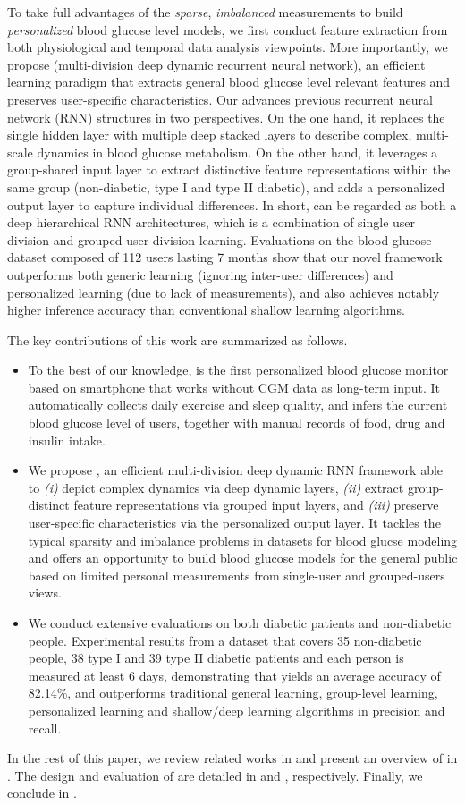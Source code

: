 To take full advantages of the \emph{sparse}, \emph{imbalanced} measurements to build \emph{personalized} blood glucose level models, we first conduct feature extraction from both physiological and temporal data analysis viewpoints. More importantly, we propose \modelname (multi-division deep dynamic recurrent neural network), an efficient learning paradigm that extracts general blood glucose level relevant features and preserves user-specific characteristics.
Our \modelname advances previous recurrent neural network (RNN) structures in two perspectives.
On the one hand, it replaces the single hidden layer with multiple deep stacked layers to describe complex, multi-scale dynamics in blood glucose metabolism.
On the other hand, it leverages a group-shared input layer to extract distinctive feature representations within the same group (\ie non-diabetic, type I and type II diabetic), and adds a personalized output layer to capture individual differences.
In short, \modelname can be regarded as both a deep hierarchical RNN architectures, \textcolor[rgb]{1.00,0.00,0.00}{which is a combination of single user division and grouped user division learning}.
Evaluations on the blood glucose dataset composed of 112 users lasting 7 months show that our novel \modelname framework outperforms both generic learning (\ie ignoring inter-user differences) and personalized learning (due to lack of measurements), and also achieves notably higher inference accuracy than conventional shallow learning algorithms.

The key contributions of this work are summarized as follows.
\begin{itemize}
  \item
  To the best of our knowledge, \sysname is the first personalized blood glucose monitor based on smartphone that works without CGM data as long-term input.
  It automatically collects daily exercise and sleep quality, and infers the current blood glucose level of users,  together with manual records of food, drug and insulin intake.
  \item
  We propose \modelname, an efficient multi-division deep dynamic RNN framework able to \emph{(i)} depict complex dynamics via deep dynamic layers, \emph{(ii)} extract group-distinct feature representations via grouped input layers, and \emph{(iii)} preserve user-specific characteristics via the personalized output layer.
\textcolor[rgb]{1.00,0.00,0.00}{ It tackles the typical sparsity and imbalance problems in datasets for blood glucse modeling and offers an opportunity to build blood glucose models for the general public based on limited personal measurements from single-user and grouped-users views.}
  \item
 \textcolor[rgb]{1.00,0.00,0.00}{ We conduct extensive evaluations on both diabetic patients and non-diabetic people.
  Experimental results from a dataset that covers 35 non-diabetic people, 38 type I and 39 type II diabetic patients and each person is measured at least 6 days, demonstrating that \sysname yields an average accuracy of 82.14\%, and outperforms traditional general learning, group-level learning, personalized learning and shallow/deep learning algorithms in precision and recall.}
\end{itemize}

In the rest of this paper, we review related works in  and present an overview of \sysname in .
The design and evaluation of \sysname are detailed in  and , respectively.
Finally, we conclude in .

